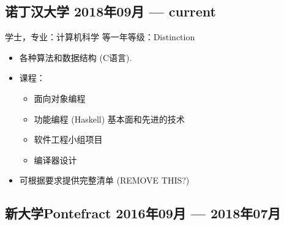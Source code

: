 \documentclass[10pt]{extarticle}
\begin{document}
        \subsection{诺丁汉大学 %
        \hfill 2018年09月 --- current}
        学士，专业：计算机科学
        \hfill
        等一年等级：Distinction\\
        {}
        \begin{itemize}
            \item 各种算法和数据结构 (C语言).
            \item 课程：
                \begin{itemize}
                    \item 面向对象编程
                    \item 功能编程 (Haskell) \textendash{} 基本面和先进的技术
                    \item 软件工程小组项目
                    \item 编译器设计
                \end{itemize}
            \item 可根据要求提供完整清单 (REMOVE THIS?)
        \end{itemize}
        \subsection{新大学Pontefract %
            \hfill 2016年09月 --- 2018年07月}
\end{document}
